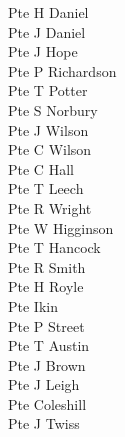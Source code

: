 \begin{multicols}{3}
  Pte H Daniel \\
  Pte J Daniel \\
  Pte J Hope \\
  Pte P Richardson \\
  Pte T Potter \\
  Pte S Norbury \\
  Pte J Wilson \\
  Pte C Wilson \\
  Pte C Hall \\
  Pte T Leech \\
  Pte R Wright \\
  Pte W Higginson \\
  Pte T Hancock \\
  Pte R Smith \\
  Pte H Royle \\
  Pte Ikin \\
  Pte P Street \\
  Pte T Austin \\
  Pte J Brown \\
  Pte J Leigh \\
  Pte Coleshill \\
  Pte J Twiss \\
\end{multicols}
